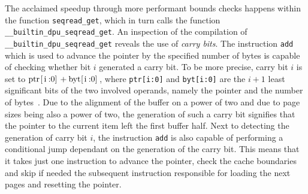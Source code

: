 The acclaimed speedup through more performant bounds checks happens within the function \lstinline|seqread_get|, which in turn calls the function \lstinline|__builtin_dpu_seqread_get|.
An inspection of the compilation of \lstinline|__builtin_dpu_seqread_get| reveals the use of \emph{carry bits}.
The instruction \lstinline|add| which is used to advance the pointer by the specified number of bytes is capable of checking whether bit \(i\) generated a carry bit.
To be more precise, carry bit \(i\) is set to \(\text{\lstinline|ptr[i:0]|} + \text{\lstinline|byt[i:0]|}\), where \lstinline|ptr[i:0]| and \lstinline|byt[i:0]| are the \(i + 1\) least significant bits of the two involved operands, namely the pointer and the number of bytes~\cite[DPU Handbook -- Specific Conditions Common To Addition and Subtraction]{upmemSDK}.
Due to the alignment of the buffer on a power of two and due to page sizes being also a power of two, the generation of such a carry bit signifies that the pointer to the current item left the first buffer half.
Next to detecting the generation of carry bit \(i\), the instruction \lstinline|add| is also capable of performing a conditional jump dependant on the generation of the carry bit.
This means that it takes just one instruction to advance the pointer, check the cache boundaries and skip \Dash if needed \Dash the subsequent instruction responsible for loading the next pages and resetting the pointer.
